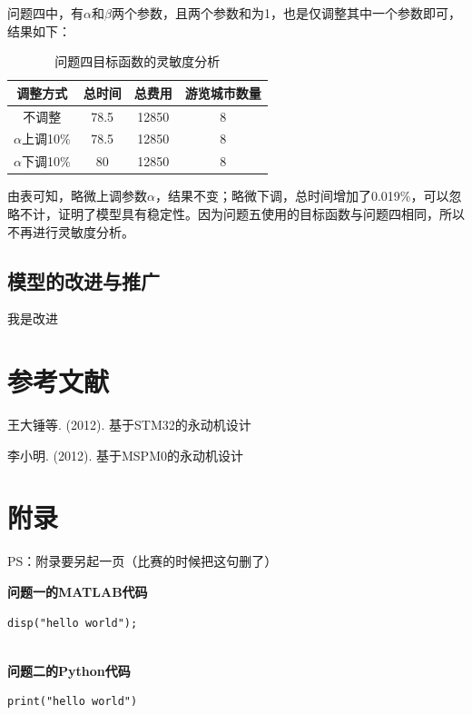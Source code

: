 \documentclass[UTF8,12pt]{ctexart}
\begin{document}
	问题四中，有$\alpha$和$\beta$两个参数，且两个参数和为1，也是仅调整其中一个参数即可，结果如下：
	
	\begin{table}[htbp]
		\centering
		\caption{问题四目标函数的灵敏度分析}
		\begin{tabular}{c c c c}
			\hline
			调整方式 & 总时间 & 总费用 & 游览城市数量 \\
			\hline
			不调整 & 78.5 & 12850 & 8 \\
			$\alpha$上调10\% & 78.5 & 12850 & 8 \\
			$\alpha$下调10\% & 80 & 12850 & 8 \\
			\hline
		\end{tabular}
	\end{table}
	
	由表可知，略微上调参数$\alpha$，结果不变；略微下调，总时间增加了0.019\%，可以忽略不计，证明了模型具有稳定性。因为问题五使用的目标函数与问题四相同，所以不再进行灵敏度分析。
	
	
	
	\subsection{模型的改进与推广}
	
	我是改进

	
	\section{参考文献}
	
	\noindent [1] 王大锤等. (2012). 基于STM32的永动机设计
	
	\noindent [2] 李小明. (2012). 基于MSPM0的永动机设计
	
	\newpage
	
	\section{附录}
	
	PS：附录要另起一页（比赛的时候把这句删了）
	
	\begin{center}
		\textbf{问题一的MATLAB代码}
	\end{center}
	
	\begin{lstlisting}[style=MATLAB]
		disp("hello world");
		
	\end{lstlisting}
	
	\begin{center}
		\textbf{问题二的Python代码}
	\end{center}
	
	\begin{lstlisting}[style=Python]
		print("hello world")
		
	\end{lstlisting}
	
\end{document}
